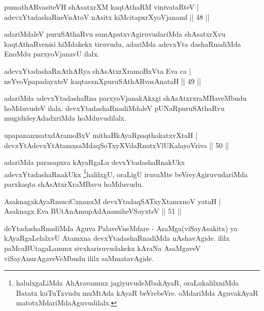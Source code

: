 \begin{shl}
pumathARvasiteVH shAsatxrXM kaqtAthaRM vinivataRteV |\\
adevxYtadashaRneVnAtoV nAsitx kiMcitapxrXyoVjanamf \hfill || 48 ||
\end{shl}

\begin{artha}
adariMdaleV puruSAthaRvu samApatxvAgiruvudariMda shAsatxrXvu kaqtAthaRvenisi hiMdakekx tiruvudu, adariMda adevxYta dashaRnadiMda EnoMdu parxyoVjanavU ilalx.
\end{artha}

\begin{shl}
adevxYtadashaRnAthARya shAsAtxrXramoBxV\s ta Eva ca |\\
neYvoVpapadayxteV kaqtasxnXpuruSAthARvasAnataH \hfill || 49 ||
\end{shl}

\begin{artha}
adariMda adevxYtadashaRna parxyoVjanakAkxgi shAsAtxrxraMBaveMbudu hoMduvudeV ilalx. devxYtadashaRnadiMdaleV pUNaRpuruSAthaRvu mugidideyAdadxriMda hoMduvudilalx.
\end{artha}


\begin{shl}
upapananxsatxdAramoBxV mithaHkAyaRpaqthakatxvXtaH |\\
devxYtAdevxYtAtamxsaMdaqSoTxyXVdaRnotxVlUKalayoVriva \hfill || 50 ||
\end{shl}

\begin{artha}
adariMda parasapxra kAyaRgaLu devxYtadashaRnakUkx adevxYta\break dashaRnakUkx  
\footnote{halulxgaLiMda AhAravanunx jagiyuvudeMbakAyaR, oraLukalilxniMda Batatx kuTuTxvudu muMtAda kAyaR beVrebeVre. oMdariMda AguvakAyaR matotxMdariMda\break Aguvudilalx.}halilxgU, oraLigU iruvaMte beVreyAgiruvudariMda parxkaqta shAsAtxrXraMBavu hoMduvudu.
\end{artha}

\begin{shl}
AsaknagxkAyaRmuciCxnanxM devxYtadaqSATxyX\s \s tamxnoV yataH |\\
Asaknagx Eva BUtAnAmupAdAnamiheVSayxteV \hfill || 51 ||
\end{shl}

\begin{artha}
deYtadashaRnadiMda Aguva PalaveVneMdare - AsaMga(viSayAsakitx) ya kAyaRgaLelalxvU Atamxna  devxYtadashaRnadiMda nAshavAgide. ililx paMcaBUtagaLanunx sivxkarisuvudakekx kAraNa AsaMgaveV viSayAnurAgaveVeMbudu ililx saMmatavAgide.
\end{artha}


